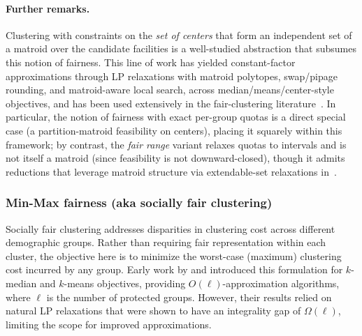 \paragraph{Further remarks.} 
Clustering with constraints on the \emph{set of centers} that form an independent set of a matroid over the candidate facilities is a well-studied abstraction that subsumes this notion of fairness. This line of work has yielded constant-factor approximations through LP relaxations with matroid polytopes, swap/pipage rounding, and matroid-aware local search, across median/means/center-style objectives, and has been used extensively in the fair-clustering literature~\citep{hajiaghayi2010budgeted,krishnaswamy2011matroid,charikar2012dependent,swamy2016improved,chen2016matroid,krishnaswamy2018constant,jones2020fair,chiplunkar2020solve}. 
In particular, the notion of fairness with exact per-group quotas is a direct special case (a partition-matroid feasibility on centers), placing it squarely within this framework; by contrast, the \emph{fair range} variant relaxes quotas to intervals and is not itself a matroid (since feasibility is not downward-closed), though it admits reductions that leverage matroid structure via extendable-set relaxations in~\citep{el2020fairness, hotegni2023approximation}. 

\subsubsection{Min-Max fairness (aka socially fair clustering)}

Socially fair clustering addresses disparities in clustering cost across different demographic groups. Rather than requiring fair representation within each cluster, the objective here is to minimize the worst-case (maximum) clustering cost incurred by any group. Early work by \citet{abbasi2021fair} and \citet{ghadiri2021socially} introduced this formulation for $k$-median and $k$-means objectives, providing $O(\ell)$-approximation algorithms, where $\ell$ is the number of protected groups. However, their results relied on natural LP relaxations that were shown to have an integrality gap of $\Omega(\ell)$, limiting the scope for improved approximations.

